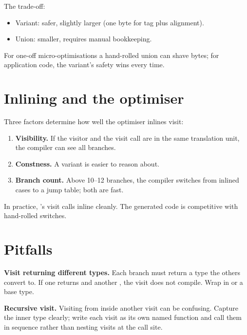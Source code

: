 The trade-off:

\begin{itemize}[leftmargin=*]
  \item Variant: safer, slightly larger (one byte for tag plus
    alignment).
  \item Union: smaller, requires manual bookkeeping.
\end{itemize}

For one-off micro-optimisations a hand-rolled union can shave
bytes; for application code, the variant's safety wins every
time.

\section{Inlining and the optimiser}

Three factors determine how well the optimiser inlines visit:

\begin{enumerate}[leftmargin=*]
  \item \textbf{Visibility.} If the visitor and the visit call
    are in the same translation unit, the compiler can see all
    branches.
  \item \textbf{Constness.} A  variant is easier to
    reason about.
  \item \textbf{Branch count.} Above 10--12 branches, the
    compiler switches from inlined cases to a jump table; both
    are fast.
\end{enumerate}

In practice, \maya{}'s visit calls inline cleanly. The
generated code is competitive with hand-rolled switches.

\section{Pitfalls}

\begin{warning}
\textbf{Visit returning different types.} Each branch must
return a type the others convert to. If one returns
 and another , the visit does not
compile. Wrap in  or a base type.
\end{warning}

\begin{warning}
\textbf{Recursive visit.} Visiting from inside another visit
can be confusing. Capture the inner type clearly; write each
visit as its own named function and call them in sequence rather
than nesting visits at the call site.
\end{warning}

